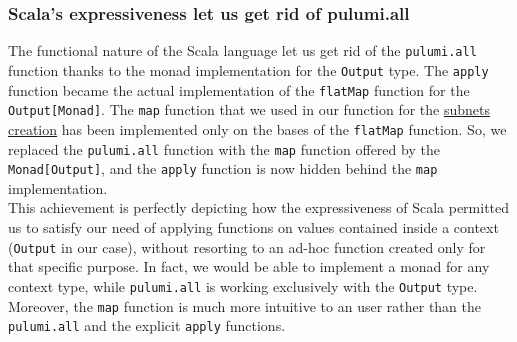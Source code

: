 \subsubsection{Scala's expressiveness let us get rid of pulumi.all}
The functional nature of the Scala language let us get rid of the \texttt{pulumi.all} function thanks to the monad implementation for the \texttt{Output} type.
The \texttt{apply} function became the actual implementation of the \texttt{flatMap} function for the \texttt{Output[Monad]}.
The \texttt{map} function that we used in our function for the \hyperref[sssec:subnets-creation]{subnets creation} has been implemented only on the bases of the \texttt{flatMap} function.
So, we replaced the \texttt{pulumi.all} function with the \texttt{map} function offered by the \texttt{Monad[Output]}, and the \texttt{apply} function is now hidden behind the \texttt{map} implementation.\\
This achievement is perfectly depicting how the expressiveness of Scala permitted us to satisfy our need of applying functions on values contained inside a context (\texttt{Output} in our case), without resorting to an ad-hoc function created only for that specific purpose.
In fact, we would be able to implement a monad for any context type, while \texttt{pulumi.all} is working exclusively with the \texttt{Output} type.
Moreover, the \texttt{map} function is much more intuitive to an user rather than the \texttt{pulumi.all} and the explicit \texttt{apply} functions.







